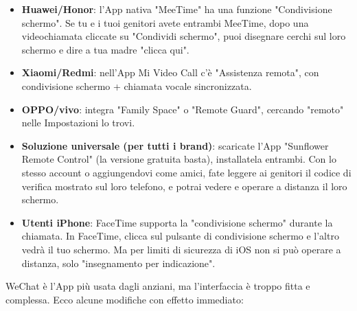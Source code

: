 \begin{itemize}
  \item \textbf{Huawei/Honor}: l'App nativa "MeeTime" ha una funzione "Condivisione schermo". Se tu e i tuoi genitori avete entrambi MeeTime, dopo una videochiamata cliccate su "Condividi schermo", puoi disegnare cerchi sul loro schermo e dire a tua madre "clicca qui".
  \item \textbf{Xiaomi/Redmi}: nell'App Mi Video Call c'è "Assistenza remota", con condivisione schermo + chiamata vocale sincronizzata.
  \item \textbf{OPPO/vivo}: integra "Family Space" o "Remote Guard", cercando "remoto" nelle Impostazioni lo trovi.
  \item \textbf{Soluzione universale (per tutti i brand)}: scaricate l'App "Sunflower Remote Control" (la versione gratuita basta), installatela entrambi. Con lo stesso account o aggiungendovi come amici, fate leggere ai genitori il codice di verifica mostrato sul loro telefono, e potrai vedere e operare a distanza il loro schermo.
  \item \textbf{Utenti iPhone}: FaceTime supporta la "condivisione schermo" durante la chiamata. In FaceTime, clicca sul pulsante di condivisione schermo e l'altro vedrà il tuo schermo. Ma per limiti di sicurezza di iOS non si può operare a distanza, solo "insegnamento per indicazione".
\end{itemize}


WeChat è l'App più usata dagli anziani, ma l'interfaccia è troppo fitta e complessa. Ecco alcune modifiche con effetto immediato:

